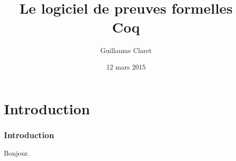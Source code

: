 \documentclass[hyperref={pdfpagelabels=false}]{beamer}
\begin{document}
  \title{Le logiciel de preuves formelles Coq}
  \author{Guillaume Claret}
  \date{12 mars 2015}
  \maketitle

  \section{Introduction}
  \begin{frame}
    \frametitle{Introduction}
    Bonjour.
  \end{frame}
\end{document}
